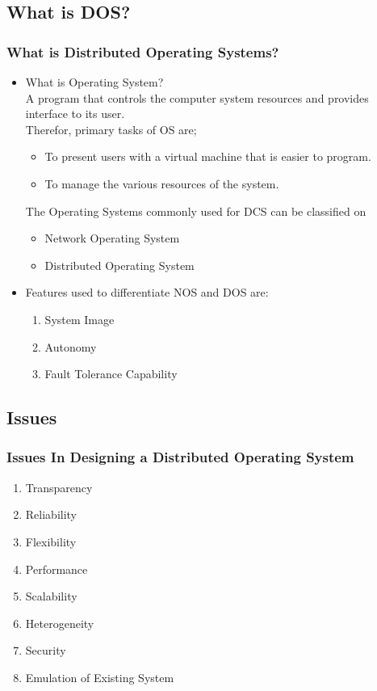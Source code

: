 \documentclass{beamer}
\begin{document}
\subsection{What is DOS?}
\begin{frame}
    \frametitle{ What is Distributed Operating Systems?}
    \begin{itemize}
      \item What is Operating System?
        \\A program that controls the computer system resources and provides interface to its user. 
	\\Therefor, primary tasks of OS are;
        \begin{itemize}
          \item To present users with a virtual machine that is easier to program.
          \item To manage the various resources of the system.
        \end{itemize}
        \vspace{0.5cm}
	The Operating Systems commonly used for DCS can be classified on
	\begin{itemize}
		\item Network Operating System
		\item Distributed Operating System
	\end{itemize}
	\vspace{0.5cm}
      \item Features used to differentiate NOS and DOS are:
      \begin{enumerate}
        \item System Image
        \item Autonomy
        \item Fault Tolerance Capability
      \end{enumerate}
    \end{itemize}
\end{frame}



\subsection{Issues}
\begin{frame}
    \frametitle{Issues In Designing a Distributed Operating System}
    \begin{enumerate}
		\item Transparency 
      	\item Reliability
      	\item Flexibility
      	\item Performance
      	\item Scalability
      	\item Heterogeneity
      	\item Security
      	\item Emulation of Existing System
    \end{enumerate}  
    \vspace{3cm} 
\end{frame}   
\end{document}
